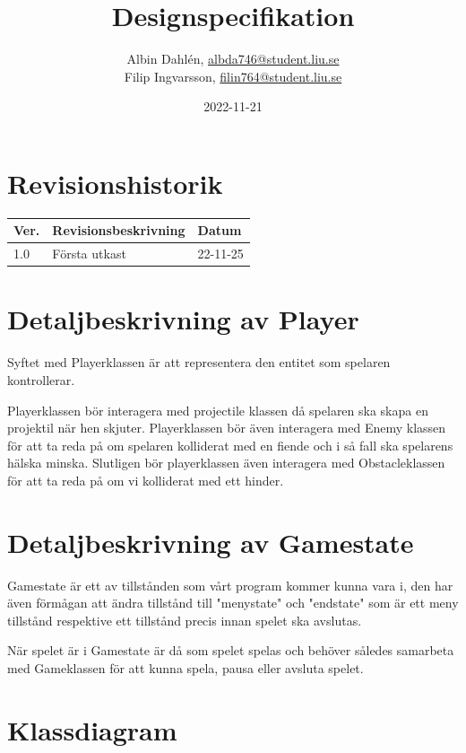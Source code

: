 \documentclass{TDP005mall}
\author{Albin Dahlén, \url{albda746@student.liu.se}\\
  Filip Ingvarsson, \url{filin764@student.liu.se}}
\title{Designspecifikation}
\date{2022-11-21}
\begin{document}
\projectpage
\section{Revisionshistorik}
\begin{table}[!h]
\begin{tabularx}{\linewidth}{|l|X|l|}
\hline
Ver. & Revisionsbeskrivning & Datum \\\hline
1.0 & Första utkast & 22-11-25 \\\hline
\end{tabularx}
\end{table}

\section{Detaljbeskrivning av Player}
Syftet med Playerklassen är att representera den entitet som spelaren kontrollerar.

Playerklassen bör interagera med projectile klassen då spelaren ska skapa en projektil när hen skjuter.
Playerklassen bör även interagera med Enemy klassen för att ta reda på om spelaren kolliderat med en fiende och i så fall ska spelarens hälska minska.
Slutligen bör playerklassen även interagera med Obstacleklassen för att ta reda på om vi kolliderat med ett hinder.

\section{Detaljbeskrivning av Gamestate}
Gamestate är ett av tillstånden som vårt program kommer kunna vara i, den har även förmågan att ändra tillstånd till "menystate" och "endstate" som är ett meny tillstånd respektive
ett tillstånd precis innan spelet ska avslutas.

När spelet är i Gamestate är då som spelet spelas och behöver således samarbeta med Gameklassen för att kunna spela, pausa eller avsluta spelet.


\section{Klassdiagram}
\end{document}
